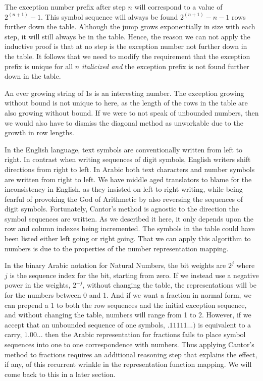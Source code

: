 \documentclass{article}
\begin{document}
	The exception number prefix after step \(n\) will correspond to a value of \(2^(n+1) - 1\). This symbol sequence will always be found \(2^(n+1)-n-1\) rows further down the table. Although the jump grows exponentially in size with each step, it will still always be in the table. Hence, the reason we can not apply the inductive proof is that at no step is the exception number not further down in the table. It follows that we need to modify the requirement that the exception prefix is unique for all \(n\) \textit{italicized and} the exception prefix is not found further down in the table.
	
	An ever growing string of \(1\)s is an interesting number. The exception growing without bound is not unique to here, as the length of the rows in the table are also growing without bound.  If we were to not speak of unbounded numbers, then we would also have to dismiss the diagonal method as unworkable due to the growth in row lengths. 
	
	In the English language, text symbols are conventionally written from left to right. In contrast when writing sequences of digit symbols, English writers shift directions from right to left. In Arabic both text characters and number symbols are written from right to left. We have middle aged translators to blame for the inconsistency in English, as they insisted on left to right writing, while being fearful of provoking the God of Arithmetic by also reversing the sequences of digit symbols. Fortunately, Cantor's method is agnostic to the direction the symbol sequences are written. As we described it here, it only depends upon the row and column indexes being incremented. The symbols in the table could have been listed either left going or right going. That we can apply this algorithm to numbers is due to the properties of the number representation mapping.
	
	In the binary Arabic notation for Natural Numbers, the bit weights are \(2^j\) where \(j\) is the sequence index for the bit, starting from zero.  If we instead use a negative power in the weights, \(2^{-j}\), without changing the table, the representations will be for the numbers between 0 and 1.  And if we want a fraction in normal form, we can prepend a \(1\) to both the row sequences and the initial exception sequence, and without changing the table, numbers will range from 1 to 2.  However, if we accept that an unbounded sequence of one symbols,  \(.11111...)\) is equivalent to a carry, \(1.00...\) then the Arabic representation for fractions fails to place symbol sequences into one to one correspondence with numbers. Thus applying Cantor's method to fractions requires an additional reasoning step that explains the effect, if any, of this recurrent wrinkle in the representation function mapping. We will come back to this in a later section.
	
\end{document}
